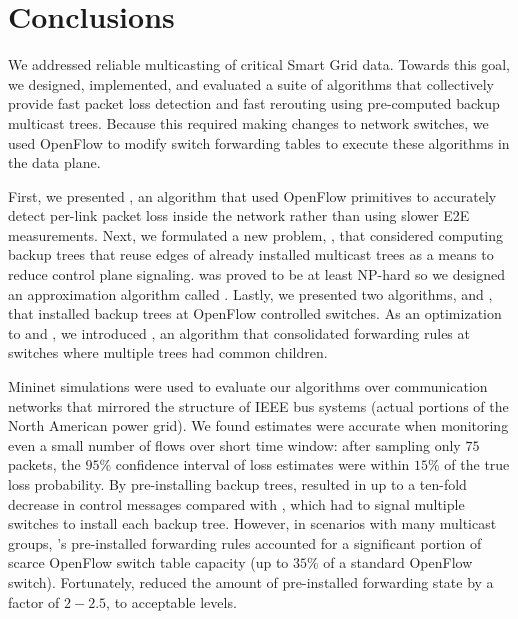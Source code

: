 \section{Conclusions}
\label{sec:conclude}

We addressed reliable multicasting of critical Smart Grid data.
Towards this goal, we designed, implemented, and evaluated a suite of algorithms that collectively provide fast packet loss detection and fast rerouting using pre-computed backup multicast trees. 
Because this required making changes to network switches, we used OpenFlow to modify switch forwarding tables to execute these algorithms in the data plane.

First, we presented \pcnts, an algorithm that used OpenFlow primitives to accurately detect per-link packet loss inside the network rather than using slower E2E measurements. %
Next, we formulated a new problem, \mcs, that considered computing
backup trees that reuse edges of already installed multicast trees as a means to reduce control plane signaling.  \mc was proved to be at least NP-hard
so we designed an approximation algorithm called \steiners.  Lastly, we presented two algorithms, \pre and \posts, that installed backup trees at OpenFlow controlled switches. 
As an optimization to \pre and \posts, 
we introduced \merges, an algorithm that consolidated forwarding rules at switches where multiple trees had common children.


Mininet simulations were used to evaluate our algorithms over communication networks that mirrored the structure of IEEE bus systems (actual portions of the North American power grid).
We found \pcnt estimates were accurate when monitoring even a small number of flows over short time window: after sampling only $75$ packets, the $95\%$ confidence interval of \pcnt loss estimates 
were within $15\%$ of the true loss probability. By pre-installing 
backup trees, \pre resulted in up to a ten-fold decrease in control messages compared with \posts, which had to signal multiple switches to install each backup tree. 
However, in scenarios with many multicast groups, \pres's pre-installed forwarding rules accounted for a significant portion of scarce OpenFlow switch table capacity (up to $35\%$ of
a standard OpenFlow switch). Fortunately, \merge reduced the amount of pre-installed forwarding state by a factor of $2-2.5$, to acceptable levels.


